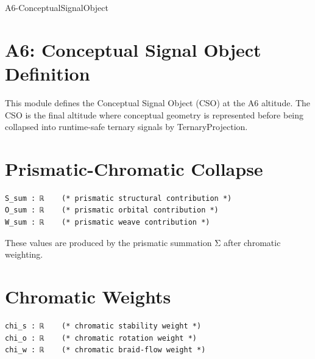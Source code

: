 \documentclass[11pt]{article}
\begin{document}


\begin{citationmembrane}{A6-ConceptualSignalObject}
\end{citationmembrane}

\section*{A6: Conceptual Signal Object Definition}

This module defines the Conceptual Signal Object (CSO) at the A6 altitude.
The CSO is the final altitude where conceptual geometry is represented before
being collapsed into runtime-safe ternary signals by TernaryProjection.

\newpage


\section{Prismatic-Chromatic Collapse}

\begin{verbatim}
S_sum : ℝ    (* prismatic structural contribution *)
O_sum : ℝ    (* prismatic orbital contribution *)
W_sum : ℝ    (* prismatic weave contribution *)
\end{verbatim}

These values are produced by the prismatic summation Σ after chromatic weighting.

\newpage


\section{Chromatic Weights}

\begin{verbatim}
chi_s : ℝ    (* chromatic stability weight *)
chi_o : ℝ    (* chromatic rotation weight *)
chi_w : ℝ    (* chromatic braid-flow weight *)
\end{verbatim}
\end{document}
